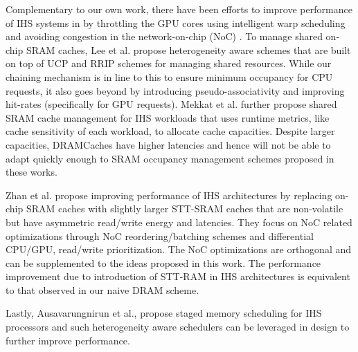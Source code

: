 \par Complementary to our own work, there have been efforts to improve performance of IHS systems in \cite{gpu-concurrency} by throttling the GPU cores using intelligent warp scheduling and avoiding congestion in the network-on-chip (NoC) \cite{interconnect}. To manage shared on-chip SRAM caches, Lee et al. \cite{tap} propose heterogeneity aware schemes that are built on top of UCP and RRIP schemes for managing shared  resources. While our chaining mechanism is in line to this to ensure minimum occupancy for CPU requests, it also goes beyond by introducing pseudo-associativity and improving hit-rates (specifically for GPU requests). Mekkat et al. \cite{helm} further propose shared SRAM cache management for IHS workloads that uses runtime metrics, like cache sensitivity of each workload, to allocate cache capacities. Despite larger capacities, DRAMCaches have higher latencies and hence will not be able to adapt quickly enough to SRAM occupancy management schemes proposed in these works.
\par Zhan et al. \cite{oscar} propose improving performance of IHS architectures by replacing on-chip SRAM caches with slightly larger STT-SRAM caches that are non-volatile but have asymmetric read/write energy and latencies. They focus on NoC related optimizations through NoC reordering/batching schemes and differential CPU/GPU, read/write prioritization. The NoC optimizations are orthogonal and can be supplemented to the ideas proposed in this work. The performance improvement due to introduction of STT-RAM in IHS architectures is equivalent to that observed in our naive DRAM scheme.
\par Lastly, Ausavarungnirun et al., \cite{sms} propose staged memory scheduling for IHS processors and such heterogeneity aware schedulers can be leveraged in \cachename design to further improve performance.
